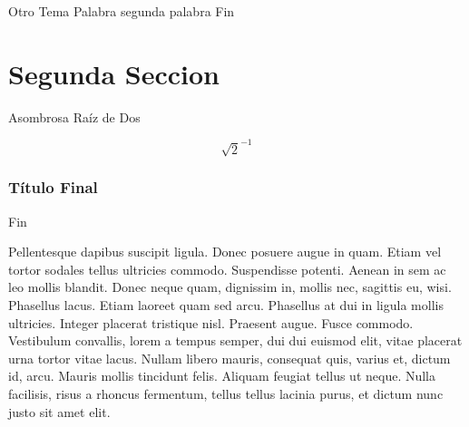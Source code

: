 \documentclass{beamer}
\begin{document}
\begin{frame}{Otro Tema}
  Palabra\pause{}
  segunda palabra\pause{}
  Fin
\end{frame}


\section{Segunda Seccion}

\frame{\tableofcontents[currentsection]}

\begin{frame}{Asombrosa Raíz de Dos}
  
  \begin{equation*}
    \sqrt{2}^{-1}
  \end{equation*}

\end{frame}

\begin{frame}
  \frametitle{Título Final}
  \begin{block}{Fin}
    \begin{multicols}{2}
      Pellentesque dapibus suscipit ligula.  Donec posuere augue in quam.  Etiam vel tortor sodales tellus ultricies commodo.  Suspendisse potenti.  Aenean in sem ac leo mollis blandit.  Donec neque quam, dignissim in, mollis nec, sagittis eu, wisi.  Phasellus lacus.  Etiam laoreet quam sed arcu.  Phasellus at dui in ligula mollis ultricies.  Integer placerat tristique nisl.  Praesent augue.  Fusce commodo.  Vestibulum convallis, lorem a tempus semper, dui dui euismod elit, vitae placerat urna tortor vitae lacus.  Nullam libero mauris, consequat quis, varius et, dictum id, arcu.  Mauris mollis tincidunt felis.  Aliquam feugiat tellus ut neque.  Nulla facilisis, risus a rhoncus fermentum, tellus tellus lacinia purus, et dictum nunc justo sit amet elit.


    \end{multicols}


  \end{block}
\end{frame}
\end{document}
